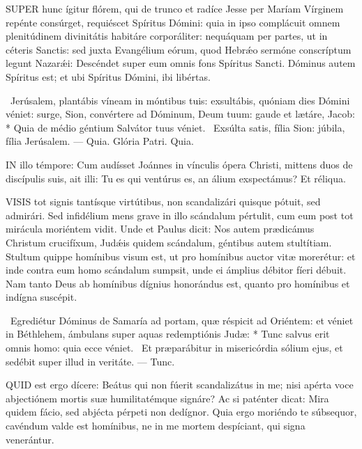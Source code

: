 
\lettrine[lines=2]{S}{UPER} hunc ígitur flórem, qui de trunco et radíce Jesse per Maríam Vírginem repénte consúrget, requiéscet Spíritus Dómini: quia in ipso complácuit omnem plenitúdinem divinitátis habitáre corporáliter: nequáquam per partes, ut in céteris Sanctis: sed juxta Evangélium eórum, quod Hebrǽo sermóne conscríptum legunt Nazarǽi: Descéndet super eum omnis fons Spíritus Sancti. Dóminus autem Spíritus est; et ubi Spíritus Dómini, ibi libértas.

\R\ Jerúsalem, plantábis víneam in móntibus tuis: exsultábis, quóniam dies Dómini véniet: surge, Sion, convértere ad Dóminum, Deum tuum: gaude et lætáre, Jacob: * Quia de médio géntium Salvátor tuus véniet. \V\ Exsúlta satis, fília Sion: júbila, fília Jerúsalem. --- Quia. Glória Patri. Quia.




\lettrine[lines=2]{I}{N} illo témpore: Cum audísset Joánnes in vínculis ópera Christi, mittens duos de discípulis suis, ait illi: Tu es qui ventúrus es, an álium exspectámus? Et réliqua.



\lettrine[lines=2]{V}{ISIS} tot signis tantísque virtútibus, non scandalizári quisque pótuit, sed admirári. Sed infidélium mens grave in illo scándalum pértulit, cum eum post tot mirácula moriéntem vidit. Unde et Paulus dicit: Nos autem prædicámus Christum crucifíxum, Judǽis quidem scándalum, géntibus autem stultítiam. Stultum quippe homínibus visum est, ut pro homínibus auctor vitæ morerétur: et inde contra eum homo scándalum sumpsit, unde ei ámplius débitor fíeri débuit. Nam tanto Deus ab homínibus dígnius honorándus est, quanto pro homínibus et indígna suscépit.

\R\ Egrediétur Dóminus de Samaría ad portam, quæ réspicit ad Oriéntem: et véniet in Béthlehem, ámbulans super aquas redemptiónis Judæ: * Tunc salvus erit omnis homo: quia ecce véniet. \V\ Et præparábitur in misericórdia sólium ejus, et sedébit super illud in veritáte. --- Tunc.


\lettrine[lines=2]{Q}{UID} est ergo dícere: Beátus qui non fúerit scandalizátus in me; nisi apérta voce abjectiónem mortis suæ humilitatémque signáre? Ac si paténter dicat: Mira quidem fácio, sed abjécta pérpeti non dedígnor. Quia ergo moriéndo te súbsequor, cavéndum valde est homínibus, ne in me mortem despíciant, qui signa venerántur.

